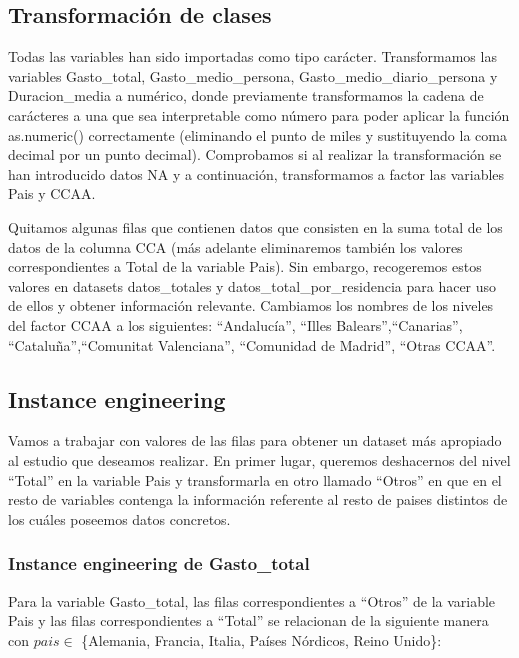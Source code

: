 \documentclass[data,article,submit,moreauthors,pdftex]{Definitions/mdpi}
\begin{document}
\hypertarget{transformaciuxf3n-de-clases}{%
\subsection{Transformación de
clases}\label{transformaciuxf3n-de-clases}}

Todas las variables han sido importadas como tipo carácter.
Transformamos las variables Gasto\_total, Gasto\_medio\_persona,
Gasto\_medio\_diario\_persona y Duracion\_media a numérico, donde
previamente transformamos la cadena de carácteres a una que sea
interpretable como número para poder aplicar la función as.numeric()
correctamente (eliminando el punto de miles y sustituyendo la coma
decimal por un punto decimal). Comprobamos si al realizar la
transformación se han introducido datos NA y a continuación,
transformamos a factor las variables Pais y CCAA.

Quitamos algunas filas que contienen datos que consisten en la suma
total de los datos de la columna CCA (más adelante eliminaremos también
los valores correspondientes a Total de la variable Pais). Sin embargo,
recogeremos estos valores en datasets datos\_totales y
datos\_total\_por\_residencia para hacer uso de ellos y obtener
información relevante. Cambiamos los nombres de los niveles del factor
CCAA a los siguientes: ``Andalucía'', ``Illes Balears'',``Canarias'',
``Cataluña'',``Comunitat Valenciana'', ``Comunidad de Madrid'', ``Otras
CCAA''.

\hypertarget{instance-engineering}{%
\subsection{Instance engineering}\label{instance-engineering}}

Vamos a trabajar con valores de las filas para obtener un dataset más
apropiado al estudio que deseamos realizar. En primer lugar, queremos
deshacernos del nivel ``Total'' en la variable Pais y transformarla en
otro llamado ``Otros'' en que en el resto de variables contenga la
información referente al resto de paises distintos de los cuáles
poseemos datos concretos.

\hypertarget{instance-engineering-de-gasto_total}{%
\subsubsection{Instance engineering de
Gasto\_total}\label{instance-engineering-de-gasto_total}}

Para la variable Gasto\_total, las filas correspondientes a ``Otros'' de
la variable Pais y las filas correspondientes a ``Total'' se relacionan
de la siguiente manera con \(pais\in\) \{Alemania, Francia, Italia,
Países Nórdicos, Reino Unido\}:
\end{document}
